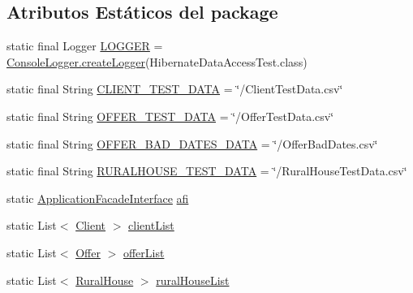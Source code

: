 \subsection*{Atributos Estáticos del \textquotesingle{}package\textquotesingle{}}
\begin{DoxyCompactItemize}
\item 
static final Logger \mbox{\hyperlink{classcom_1_1ruralhousejsf_1_1_hibernate_data_access_test_a9eb49660cab06be45dd2c75727b59ed3}{L\+O\+G\+G\+ER}} = \mbox{\hyperlink{classcom_1_1ruralhousejsf_1_1logger_1_1_console_logger_a520321643663e37d95761134a35505cd}{Console\+Logger.\+create\+Logger}}(Hibernate\+Data\+Access\+Test.\+class)
\item 
static final String \mbox{\hyperlink{classcom_1_1ruralhousejsf_1_1_hibernate_data_access_test_ae42994f5a5d8bf916a38b64cda2788b1}{C\+L\+I\+E\+N\+T\+\_\+\+T\+E\+S\+T\+\_\+\+D\+A\+TA}} = \char`\"{}/Client\+Test\+Data.\+csv\char`\"{}
\item 
static final String \mbox{\hyperlink{classcom_1_1ruralhousejsf_1_1_hibernate_data_access_test_a59951fd66def285f9ae4e140ee9eb8be}{O\+F\+F\+E\+R\+\_\+\+T\+E\+S\+T\+\_\+\+D\+A\+TA}} = \char`\"{}/Offer\+Test\+Data.\+csv\char`\"{}
\item 
static final String \mbox{\hyperlink{classcom_1_1ruralhousejsf_1_1_hibernate_data_access_test_a8fbef10c94c800b06db31a91c4be95bf}{O\+F\+F\+E\+R\+\_\+\+B\+A\+D\+\_\+\+D\+A\+T\+E\+S\+\_\+\+D\+A\+TA}} = \char`\"{}/Offer\+Bad\+Dates.\+csv\char`\"{}
\item 
static final String \mbox{\hyperlink{classcom_1_1ruralhousejsf_1_1_hibernate_data_access_test_a9f9d6116edd1cdeb60cf726a921d148f}{R\+U\+R\+A\+L\+H\+O\+U\+S\+E\+\_\+\+T\+E\+S\+T\+\_\+\+D\+A\+TA}} = \char`\"{}/Rural\+House\+Test\+Data.\+csv\char`\"{}
\item 
static \mbox{\hyperlink{interfacecom_1_1ruralhousejsf_1_1business_logic_1_1_application_facade_interface}{Application\+Facade\+Interface}} \mbox{\hyperlink{classcom_1_1ruralhousejsf_1_1_hibernate_data_access_test_a80a8ded7f2e12687541427d97fdbe29a}{afi}}
\item 
static List$<$ \mbox{\hyperlink{classcom_1_1ruralhousejsf_1_1domain_1_1_client}{Client}} $>$ \mbox{\hyperlink{classcom_1_1ruralhousejsf_1_1_hibernate_data_access_test_a9c323e2ca2ed9c802bff65a3a10d88f5}{client\+List}}
\item 
static List$<$ \mbox{\hyperlink{classcom_1_1ruralhousejsf_1_1domain_1_1_offer}{Offer}} $>$ \mbox{\hyperlink{classcom_1_1ruralhousejsf_1_1_hibernate_data_access_test_a75c40ab88ced6c053e2067b1515c18b9}{offer\+List}}
\item 
static List$<$ \mbox{\hyperlink{classcom_1_1ruralhousejsf_1_1domain_1_1_rural_house}{Rural\+House}} $>$ \mbox{\hyperlink{classcom_1_1ruralhousejsf_1_1_hibernate_data_access_test_a989d035f20b8a64527db2fbbd411943e}{rural\+House\+List}}
\end{DoxyCompactItemize}
